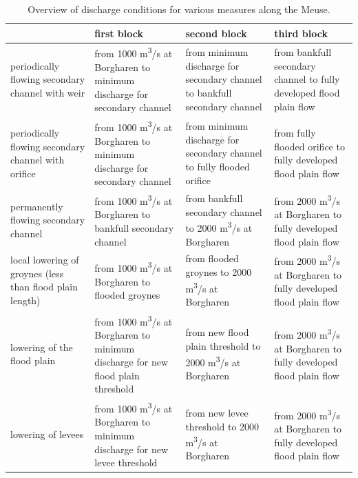 \begin{table}
\begin{tabular}{p{}|p{}|p{}|p{}}
 & first block & second block & third block \\ \hline
periodically flowing secondary channel with weir & from 1000 m\textsuperscript{3}/s at Borgharen to minimum discharge for secondary channel & from minimum discharge for secondary channel to bankfull secondary channel & from bankfull secondary channel to fully developed flood plain flow \\ \hline
periodically flowing secondary channel with orifice & from 1000 m\textsuperscript{3}/s at Borgharen to minimum discharge for secondary channel & from minimum discharge for secondary channel to fully flooded orifice & from fully flooded orifice to fully developed flood plain flow \\ \hline
permanently flowing secondary channel & from 1000 m\textsuperscript{3}/s at Borgharen to bankfull secondary channel & from bankfull secondary channel to 2000 m\textsuperscript{3}/s at Borgharen & from 2000 m\textsuperscript{3}/s at Borgharen to fully developed flood plain flow \\ \hline
local lowering of groynes (less than flood plain length) & from 1000 m\textsuperscript{3}/s at Borgharen to flooded groynes & from flooded groynes to 2000 m\textsuperscript{3}/s at Borgharen & from 2000 m\textsuperscript{3}/s at Borgharen to fully developed flood plain flow \\ \hline
lowering of the flood plain & from 1000 m\textsuperscript{3}/s at Borgharen to minimum discharge for new flood plain threshold & from new flood plain threshold to 2000 m\textsuperscript{3}/s at Borgharen & from 2000 m\textsuperscript{3}/s at Borgharen to fully developed flood plain flow \\ \hline
lowering of levees & from 1000 m\textsuperscript{3}/s at Borgharen to minimum discharge for new levee threshold & from new levee threshold to 2000 m\textsuperscript{3}/s at Borgharen & from 2000 m\textsuperscript{3}/s at Borgharen to fully developed flood plain flow \\
\end{tabular}

\caption{Overview of discharge conditions for various measures along the Meuse.}
\label{App.Tab3}
\end{table}

